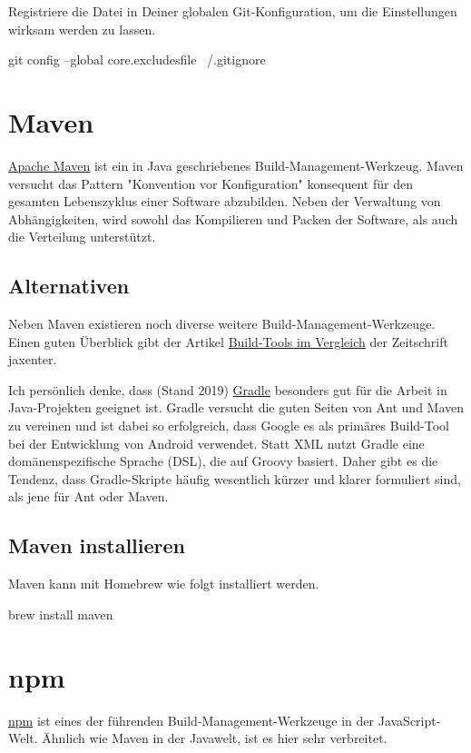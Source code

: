 \documentclass[]{article}
\begin{document}
Registriere die Datei in Deiner globalen Git-Konfiguration, um die Einstellungen wirksam werden zu lassen.
\begin{bashcode}
git config --global core.excludesfile ~/.gitignore
\end{bashcode}

\section{Maven}
\href{https://maven.apache.org/}{Apache Maven} ist ein in Java geschriebenes Build-Management-Werkzeug. Maven versucht das Pattern "Konvention vor Konfiguration" konsequent für den gesamten Lebenszyklus einer Software abzubilden. Neben der Verwaltung von Abhängigkeiten, wird sowohl das Kompilieren und Packen der Software, als auch die Verteilung unterstützt.

\subsection{Alternativen}
Neben Maven existieren noch diverse weitere Build-Management-Werkzeuge. Einen guten Überblick gibt der Artikel \href{https://jaxenter.de/8-build-tools-im-vergleich-ant-buildr-maven-bazel-buck-gradle-pants-sbt-41627}{Build-Tools im Vergleich} der Zeitschrift jaxenter.

Ich persönlich denke, dass (Stand 2019) \href{https://gradle.org/}{Gradle} besonders gut für die Arbeit in Java-Projekten geeignet ist. Gradle versucht die guten Seiten von Ant und Maven zu vereinen und ist dabei so erfolgreich, dass Google es als primäres Build-Tool bei der Entwicklung von Android verwendet. Statt XML nutzt Gradle eine domänenspezifische Sprache (DSL), die auf Groovy basiert. Daher gibt es die Tendenz, dass Gradle-Skripte häufig wesentlich kürzer und klarer formuliert sind, als jene für Ant oder Maven.

\subsection{Maven installieren}
Maven kann mit Homebrew wie folgt installiert werden.
\begin{bashcode}
brew install maven
\end{bashcode}



\section{npm}
\href{https://www.npmjs.com/}{npm} ist eines der führenden Build-Management-Werkzeuge in der JavaScript-Welt. Ähnlich wie Maven in der Javawelt, ist es hier sehr verbreitet. 
\end{document}
